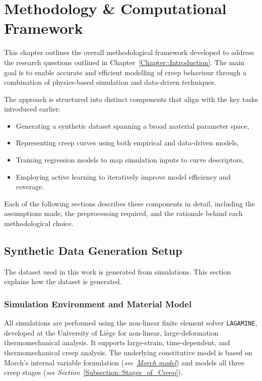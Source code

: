 \documentclass[class=scrbook, crop=false]{standalone}
\begin{document}
	
	\chapter{Methodology \& Computational Framework}
	\label{Chapter::Methodology}
	
	This chapter outlines the overall methodological framework developed to address the research questions outlined in Chapter~\ref{Chapter::Introduction}. The main goal is to enable accurate and efficient modelling of creep behaviour through a combination of physics-based simulation and data-driven techniques.
	
	The approach is structured into distinct components that align with the key tasks introduced earlier:
	\begin{itemize}
		\item Generating a synthetic dataset spanning a broad material parameter space,
		\item Representing creep curves using both empirical and data-driven models,
		\item Training regression models to map simulation inputs to curve descriptors,
		\item Employing active learning to iteratively improve model efficiency and coverage.
	\end{itemize}
	
	Each of the following sections describes these components in detail, including the assumptions made, the preprocessing required, and the rationale behind each methodological choice.
	
	\section{Synthetic Data Generation Setup}
	\label{Section::Synthetic_data_generation}
	
	The dataset used in this work is generated from simulations. This section explains how the dataset is generated.
	
	\subsection{Simulation Environment and Material Model}
	
	All simulations are performed using the non-linear finite element solver \texttt{LAGAMINE}, developed at the University of Liège for non-linear, large-deformation thermomechanical analysis. It supports large-strain, time-dependent, and thermomechanical creep analysis. The underlying constitutive model is based on Morch's internal variable formulation (\textit{see~\hyperref[Subsubsection::Morch_Model_Definition]{Morch model}}) and models all three creep stages (\textit{see Section}~\ref{Subsection::Stages_of_Creep}).
	
\end{document}
